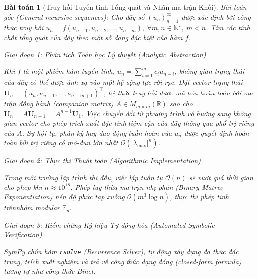 \documentclass{article}
\newtheorem{baitoan}{Bài toán}
\begin{document}
\begin{baitoan}[Truy hồi Tuyến tính Tổng quát và Nhân ma trận Khối]
 \emph{Bài toán gốc (General recursive sequences):} 
 Cho dãy số $(u_n)_{n=1}^\infty$ được xác định bởi công thức truy hồi
 $u_n = f(u_{n-1},u_{n-2},\ldots,u_{n-m}),\ \forall m,n\in\mathbb{N}^\star,\ m < n$.
 Tìm các tính chất tổng quát của dãy theo một số dạng đặc biệt của hàm $f$.

\vspace{0.5em}\noindent\emph{Giai đoạn 1: Phân tích Toán học Lý thuyết (Analytic Abstraction)}
 
 Khi $f$ là một phiếm hàm tuyến tính, $u_n = \sum_{i=1}^m c_i u_{n-i}$, không gian trạng thái của dãy có thể được ánh xạ vào một hệ động lực rời rạc. Đặt vector trạng thái $\mathbf{U}_n = (u_n, u_{n-1}, \dots, u_{n-m+1})^\top$, hệ thức truy hồi được mã hóa hoàn toàn bởi ma trận đồng hành (companion matrix) $A \in M_{m \times m}(\mathbb{R})$ sao cho $\mathbf{U}_n = A \mathbf{U}_{n-1} = A^{n-1} \mathbf{U}_1$.
 Việc chuyển đổi từ phương trình vô hướng sang không gian vector cho phép trích xuất đặc tính tiệm cận của dãy thông qua phổ trị riêng của $A$. Sự hội tụ, phân kỳ hay dao động tuần hoàn của $u_n$ được quyết định hoàn toàn bởi trị riêng có mô-đun lớn nhất $\mathcal{O}(|\lambda_{\max}|^n)$.

\vspace{0.5em}\noindent\emph{Giai đoạn 2: Thực thi Thuật toán (Algorithmic Implementation)}
 
 Trong môi trường lập trình thi đấu, việc lặp tuần tự $\mathcal{O}(n)$ sẽ vượt quá thời gian cho phép khi $n \approx 10^{18}$. Phép lũy thừa ma trận nhị phân (Binary Matrix Exponentiation) nén độ phức tạp xuống $\mathcal{O}(m^3 \log n)$, thực thi phép tính trênnhóm modular $\mathbb{F}_p$.



\vspace{0.5em}\noindent\emph{Giai đoạn 3: Kiểm chứng Ký hiệu Tự động hóa (Automated Symbolic Verification)}
 
 \textsf{SymPy} chứa hàm \texttt{rsolve} (Recurrence Solver), tự động xây dựng đa thức đặc trưng, trích xuất nghiệm và trả về công thức dạng đóng (closed-form formula) tương tự như công thức Binet.




\end{baitoan}
\end{document}
